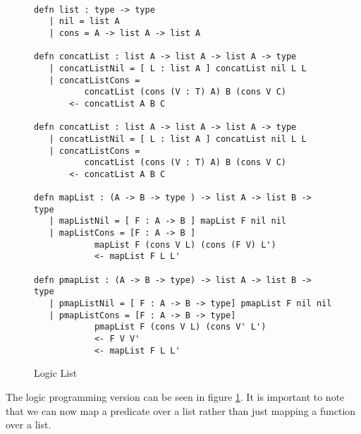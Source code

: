 \begin{figure}[H]
\begin{lstlisting}

defn list : type -> type
   | nil = list A
   | cons = A -> list A -> list A

defn concatList : list A -> list A -> list A -> type
   | concatListNil = [ L : list A ] concatList nil L L
   | concatListCons = 
          concatList (cons (V : T) A) B (cons V C) 
       <- concatList A B C

defn concatList : list A -> list A -> list A -> type
   | concatListNil = [ L : list A ] concatList nil L L
   | concatListCons = 
          concatList (cons (V : T) A) B (cons V C) 
       <- concatList A B C

defn mapList : (A -> B -> type ) -> list A -> list B -> type
   | mapListNil = [ F : A -> B ] mapList F nil nil
   | mapListCons = [F : A -> B ] 
            mapList F (cons V L) (cons (F V) L')
            <- mapList F L L'

defn pmapList : (A -> B -> type) -> list A -> list B -> type
   | pmapListNil = [ F : A -> B -> type] pmapList F nil nil
   | pmapListCons = [F : A -> B -> type] 
            pmapList F (cons V L) (cons V' L')
            <- F V V'
            <- mapList F L L'
\end{lstlisting}
\caption{Logic List}
\label{code:llist}
\end{figure}

The logic programming version can be seen in figure \ref{code:llist}. It is important to note that
we can now map a predicate over a list rather than just mapping a function over a list.
